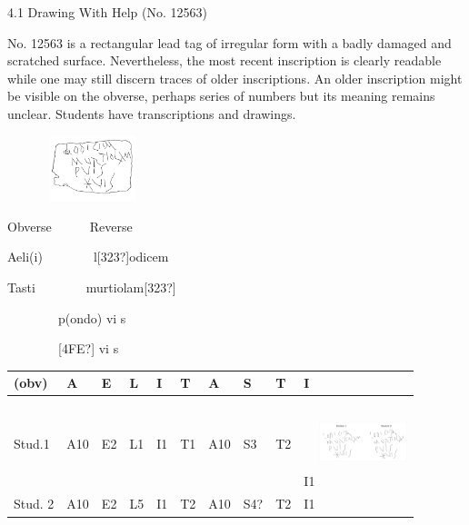 \documentclass[amsthm,ebook]{saparticle}
\begin{document}
4.1 Drawing With Help (No. 12563)

\begin{figure}

\end{figure}
No. 12563 is a rectangular lead tag of irregular form with a badly damaged and scratched surface. Nevertheless, the most
recent inscription is clearly readable while one may still discern traces of older inscriptions. An older inscription
might be visible on the obverse, perhaps series of numbers but its meaning remains unclear. Students have
transcriptions and drawings.

\begin{figure}
\centering
\includegraphics[width=2.845cm,height=1.896cm]{EAGLE16lameetalteaching-img007.png}
\end{figure}
Obverse\ \ \ \ \ \ Reverse

Aeli(i)\ \ \ \ \ \ \ \ l[323?]odicem

Tasti\ \ \ \ \ \ \ \ murtiolam[323?]

\ \ \ \ \ \ \ \ p(ondo) vi s

\ \ \ \ \ \ \ \ [4FE?] vi s

\begin{flushleft}
\tablefirsthead{}
\tablehead{}
\tabletail{}
\tablelasttail{}
\begin{supertabular}{|m{1.4399999cm}|m{0.518cm}|m{0.37700003cm}|m{0.361cm}|m{0.297cm}|m{0.361cm}|m{0.518cm}|m{0.486cm}|m{0.361cm}|m{0.30300003cm}|}
\hline
{} (obv) &
A &
E &
L &
I &
T &
A &
S &
T &
I\\\hline
\centering Stud.1 &
A10 &
E2 &
L1 &
I1 &
T1 &
A10 &
S3 &
T2 &
I1\centering
\includegraphics[width=2.563cm,height=2.579cm]{EAGLE16lameetalteaching-img008.png}
\\\hline
\centering Stud. 2 &
A10 &
E2 &
L5 &
I1 &
T2 &
A10 &
S4? &
T2 &
I1\\\hline
\end{supertabular}
\end{flushleft}
\end{document}
